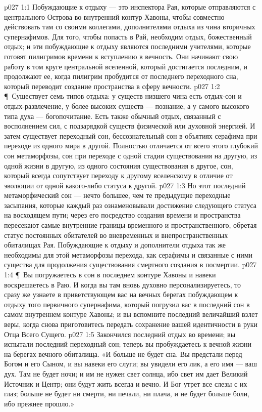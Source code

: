 \vs p027 1:1 Побуждающие к отдыху --- это инспектора Рая, которые отправляются с центрального Острова во внутренний контур Хавоны, чтобы совместно действовать там со своими коллегами, дополнителями отдыха из чина вторичных супернафимов. Для того, чтобы попасть в Рай, необходим отдых, божественный отдых; и эти побуждающие к отдыху являются последними учителями, которые готовят пилигримов времени к вступлению в вечность. Они начинают свою работу в том круге центральной вселенной, который достигается последним, и продолжают ее, когда пилигрим пробудится от последнего переходного сна, который переводит создание пространства в сферу вечности.
\vs p027 1:2 \P\ Существует семь типов отдыха: у существ низшего чина есть отдых\hyp{}сон и отдых\hyp{}развлечение, у более высоких существ --- познание, а у самого высокого типа духа --- богопочитание. Есть также обычный отдых, связанный с восполнением сил, с подзарядкой существ физической или духовной энергией. И затем существует переходный сон, бессознательный сон в объятиях серафима при переходе из одного мира в другой. Полностью отличается от всего этого глубокий сон метаморфозы, сон при переходе с одной стадии существования на другую, из одной жизни в другую, из одного состояния существования в другое, сон, который всегда сопутствует переходу к другому вселенскому  в отличие от эволюции от одной  какого\hyp{}либо статуса к другой.
\vs p027 1:3 Но этот последний метаморфический сон --- нечто большее, чем те предыдущие переходные засыпания, которые каждый раз ознаменовывали достижение следующего статуса на восходящем пути; через его посредство создания времени и пространства пересекают самые внутренние границы временного и пространственного, обретая статус постоянных обитателей во вневременных и внепространственных обиталищах Рая. Побуждающие к отдыху и дополнители отдыха так же необходимы для этой метаморфозы перехода, как серафимы и связанные с ними существа для продолжения существования смертного создания в посмертии.
\vs p027 1:4 \P\ Вы погружаетесь в сон в последнем контуре Хавоны и навеки воскрешаетесь в Раю. И когда вы там вновь духовно персонализируетесь, то сразу же узнаете в приветствующем вас на вечных берегах побуждающем к отдыху того первичного супернафима, который погрузил вас в последний сон в самом внутреннем контуре Хавоны; и вы вспомните последний величайший взлет веры, когда снова приготовитесь передать сохранение вашей идентичности в руки Отца Всего Сущего.
\vs p027 1:5 Закончился последний отдых во времени; вы испытали последний переходный сон; теперь вы пробуждаетесь к вечной жизни на берегах вечного обиталища. «И больше не будет сна. Вы предстали перед Богом и его Сыном, и вы навеки его слуги; вы увидели его лик, а его имя --- ваш дух. Там не будет ночи; и им не нужен свет солнца, ибо свет им дает Великий Источник и Центр; они будут жить всегда и вечно. И Бог утрет все слезы с их глаз; больше не будет ни смерти, ни печали, ни плача, и не будет больше боли, ибо прежнее прошло.»

